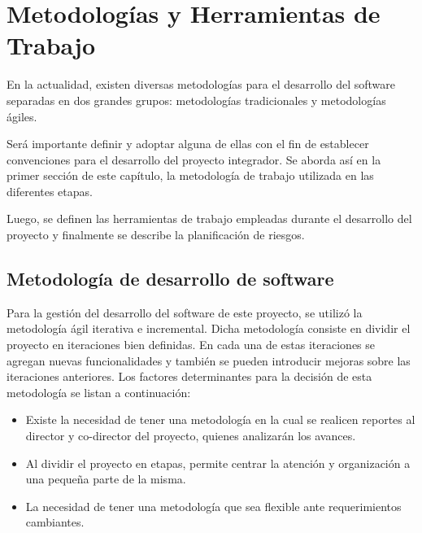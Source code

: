 
\chapter{Metodologías y Herramientas de Trabajo} %

\label{Chapter4} %
En la actualidad, existen diversas metodologías para el desarrollo del software separadas en dos grandes grupos: metodologías tradicionales y metodologías ágiles. 

Será importante definir y adoptar alguna de ellas con el fin de establecer convenciones para el desarrollo del proyecto integrador. Se aborda así en la primer sección de este capítulo, la metodología de trabajo utilizada en las diferentes etapas.

Luego, se definen las herramientas de trabajo empleadas durante el desarrollo del proyecto y finalmente se describe la planificación de riesgos.


\section{Metodología de desarrollo de software}
Para la gestión del desarrollo del software de este proyecto, se utilizó la metodología ágil iterativa e incremental. Dicha metodología consiste en dividir el proyecto en iteraciones bien definidas. En cada una de estas iteraciones se agregan nuevas funcionalidades y también se pueden introducir mejoras sobre las iteraciones anteriores. Los factores determinantes para la decisión de esta metodología se listan a continuación:

\begin{itemize}
	\item Existe la necesidad de tener una metodología en la cual se realicen reportes al director y co-director del proyecto, quienes analizarán los avances.
	\item Al dividir el proyecto en etapas, permite centrar la atención y organización a una pequeña parte de la misma.
	\item La necesidad de tener una metodología que sea flexible ante requerimientos cambiantes.
\end{itemize}

